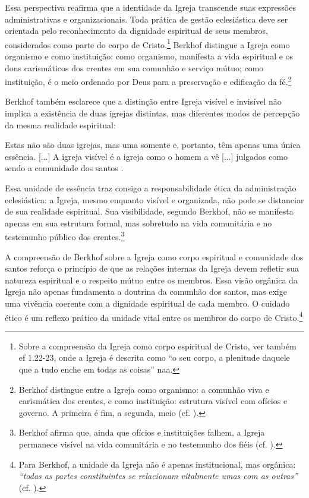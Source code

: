 Essa perspectiva reafirma que a identidade da Igreja transcende suas expressões administrativas e organizacionais. Toda prática de gestão eclesiástica deve ser orientada pelo reconhecimento da dignidade espiritual de seus membros, considerados como parte do corpo de Cristo.\footnote{Sobre a compreensão da Igreja como corpo espiritual de Cristo, ver também \gls{ef} 1.22-23, onde a Igreja é descrita como ``o seu corpo, a plenitude daquele que a tudo enche em todas as coisas'' \gls{naa}.} Berkhof distingue a Igreja como organismo e como instituição: como organismo, manifesta a vida espiritual e os dons carismáticos dos crentes em sua comunhão e serviço mútuo; como instituição, é o meio ordenado por Deus para a preservação e edificação da fé.\footnote{Berkhof distingue entre a Igreja como organismo: a comunhão viva e carismática dos crentes, e como instituição: estrutura visível com ofícios e governo. A primeira é fim, a segunda, meio (cf. \cite[p.~638]{berkhof2012}).}

Berkhof também esclarece que a distinção entre Igreja visível e invisível não implica a existência de duas igrejas distintas, mas diferentes modos de percepção da mesma realidade espiritual:

\begin{citacao}
Estas não são duas igrejas, mas uma somente e, portanto, têm apenas uma única essência. [...] A igreja visível é a igreja como o homem a vê [...] julgados como sendo a comunidade dos santos \cite[p.~642]{berkhof2012}.
\end{citacao}

Essa unidade de essência traz consigo a responsabilidade ética da administração eclesiástica: a Igreja, mesmo enquanto visível e organizada, não pode se distanciar de sua realidade espiritual. Sua visibilidade, segundo Berkhof, não se manifesta apenas em sua estrutura formal, mas sobretudo na vida comunitária e no testemunho público dos crentes.\footnote{Berkhof afirma que, ainda que ofícios e instituições falhem, a Igreja permanece visível na vida comunitária e no testemunho dos fiéis (cf. \cite[p.~645]{berkhof2012}).}

A compreensão de Berkhof sobre a Igreja como corpo espiritual e comunidade dos santos reforça o princípio de que as relações internas da Igreja devem refletir sua natureza espiritual e o respeito mútuo entre os membros. Essa visão orgânica da Igreja não apenas fundamenta a doutrina da comunhão dos santos, mas exige uma vivência coerente com a dignidade espiritual de cada membro. O cuidado ético é um reflexo prático da unidade vital entre os membros do corpo de Cristo.\footnote{Para Berkhof, a unidade da Igreja não é apenas institucional, mas orgânica: \textit{``todas as partes constituintes se relacionam vitalmente umas com as outras''} (cf. \cite[p.~646]{berkhof2012}).}

